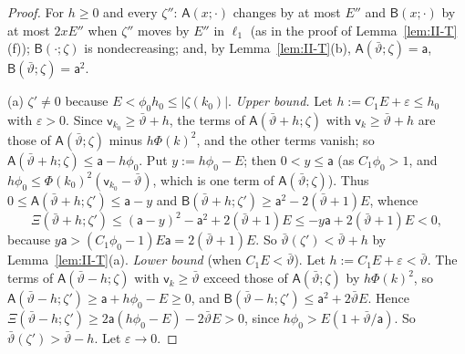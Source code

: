 \documentclass[10pt]{amsart}
\theoremstyle{definition}
\theoremstyle{remark}
\begin{document}
\begin{proof}
For $h\ge0$ and every $\zeta''$: $\mathsf A(x;\cdot)$ changes by at most $E''$
and $\mathsf B(x;\cdot)$ by at most $2xE''$ when $\zeta''$ moves by $E''$ in
$\ell_1$ (as in the proof of Lemma~\ref{lem:II-T}(f)); $\mathsf
B(\cdot;\zeta)$ is nondecreasing; and, by Lemma~\ref{lem:II-T}(b),
$\mathsf A(\bar\vartheta;\zeta)=\mathsf a$, $\mathsf B(\bar\vartheta;\zeta)=\mathsf
a^2$.

(a) $\zeta'\ne0$ because $E<\phi_0h_0\le|\zeta(k_0)|$.  \emph{Upper bound.}
Let $h:=C_1E+\varepsilon\le h_0$ with $\varepsilon>0$.  Since $\mathsf
v_{k_0}\ge\bar\vartheta+h$, the terms of $\mathsf A(\bar\vartheta+h;\zeta)$ with
$\mathsf v_k\ge\bar\vartheta+h$ are those of $\mathsf A(\bar\vartheta;\zeta)$
minus $h\Phi(k)^2$, and the other terms vanish; so $\mathsf
A(\bar\vartheta+h;\zeta)\le\mathsf a-h\phi_0$.  Put $y:=h\phi_0-E$; then
$0<y\le\mathsf a$ (as $C_1\phi_0>1$, and $h\phi_0\le\Phi(k_0)^2(\mathsf
v_{k_0}-\bar\vartheta)$, which is one term of $\mathsf
A(\bar\vartheta;\zeta)$).  Thus $0\le\mathsf A(\bar\vartheta+h;\zeta')\le\mathsf
a-y$ and $\mathsf B(\bar\vartheta+h;\zeta')\ge\mathsf a^2-2(\bar\vartheta+1)E$,
whence
\[
 \Xi(\bar\vartheta+h;\zeta')\le(\mathsf a-y)^2-\mathsf a^2+2(\bar\vartheta+1)E
 \le-y\mathsf a+2(\bar\vartheta+1)E<0,
\]
because $y\mathsf a>(C_1\phi_0-1)E\mathsf a=2(\bar\vartheta+1)E$.  So
$\bar\vartheta(\zeta')<\bar\vartheta+h$ by Lemma~\ref{lem:II-T}(a).
\emph{Lower bound} (when $C_1E<\bar\vartheta$).  Let $h:=C_1E+\varepsilon<
\bar\vartheta$.  The terms of $\mathsf A(\bar\vartheta-h;\zeta)$ with $\mathsf
v_k\ge\bar\vartheta$ exceed those of $\mathsf A(\bar\vartheta;\zeta)$ by
$h\Phi(k)^2$, so $\mathsf A(\bar\vartheta-h;\zeta')\ge\mathsf a+h\phi_0-E\ge0$,
and $\mathsf B(\bar\vartheta-h;\zeta')\le\mathsf a^2+2\bar\vartheta E$.  Hence
$\Xi(\bar\vartheta-h;\zeta')\ge2\mathsf a(h\phi_0-E)-2\bar\vartheta E>0$, since
$h\phi_0>E(1+\bar\vartheta/\mathsf a)$.  So $\bar\vartheta(\zeta')>\bar\vartheta-h$.
Let $\varepsilon\to0$.


\end{proof}
\end{document}
